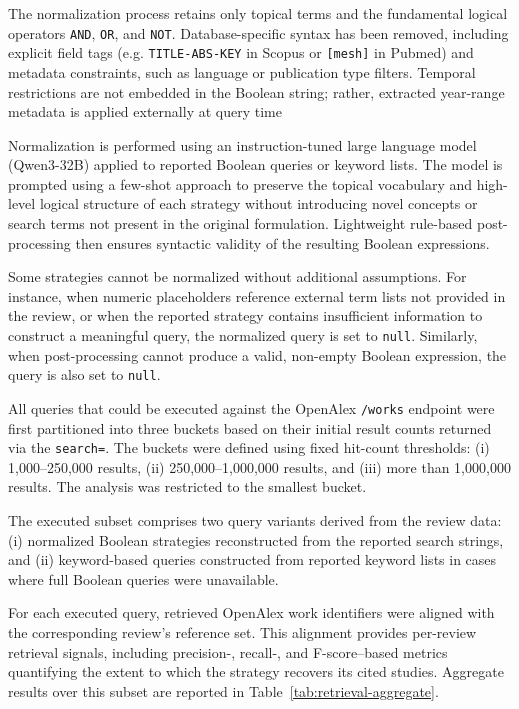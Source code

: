 The normalization process retains only topical terms and the fundamental logical operators \texttt{AND}, \texttt{OR}, and \texttt{NOT}. Database-specific syntax has been removed, including explicit field tags (e.g. \texttt{TITLE-ABS-KEY} in Scopus or \texttt{[mesh]} in Pubmed) and metadata constraints, such as language or publication type filters. Temporal restrictions are not embedded in the Boolean string; rather, extracted year-range metadata is applied externally at query time

Normalization is performed using an instruction-tuned large language model (Qwen3-32B) applied to reported Boolean queries or keyword lists. The model is prompted using a few-shot approach to preserve the topical vocabulary and high-level logical structure of each strategy without introducing novel concepts or search terms not present in the original formulation. Lightweight rule-based post-processing then ensures syntactic validity of the resulting Boolean expressions.

Some strategies cannot be normalized without additional assumptions. For instance, when numeric placeholders reference external term lists not provided in the review, or when the reported strategy contains insufficient information to construct a meaningful query, the normalized query is set to \texttt{null}. Similarly, when post-processing cannot produce a valid, non-empty Boolean expression, the query is also set to \texttt{null}. 

All queries that could be executed against the OpenAlex \texttt{/works} endpoint were first partitioned into three buckets based on their initial result counts returned via the \texttt{search=}. The buckets were defined using fixed hit-count thresholds: (i) 1,000–250,000 results, (ii) 250,000–1,000,000 results, and (iii) more than 1,000,000 results. The analysis was restricted to the smallest bucket.

The executed subset comprises two query variants derived from the review data: (i) normalized Boolean strategies reconstructed from the reported search strings, and (ii) keyword-based queries constructed from reported keyword lists in cases where full Boolean queries were unavailable.

For each executed query, retrieved OpenAlex work identifiers were aligned with the corresponding review’s reference set. This alignment provides per-review retrieval signals, including precision-, recall-, and F-score–based metrics quantifying the extent to which the strategy recovers its cited studies. Aggregate results over this subset are reported in Table~\ref{tab:retrieval-aggregate}.

